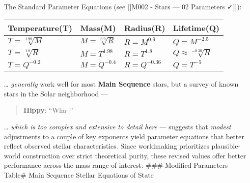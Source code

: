 \documentclass[
  letterpaper,
]{book}
\begin{document}
The Standard Parameter Equations (see {[}{[}M002 - Stars --- 02
Parameters ✓{]}{]}):

\begin{longtable}[]{@{}
  >{\centering\arraybackslash}p{}
  >{\centering\arraybackslash}p{}
  >{\centering\arraybackslash}p{}
  >{\centering\arraybackslash}p{}@{}}
\toprule\noalign{}
\begin{minipage}[b]{\linewidth}\centering
Temperature(T)
\end{minipage} & \begin{minipage}[b]{\linewidth}\centering
Mass(M)
\end{minipage} & \begin{minipage}[b]{\linewidth}\centering
Radius(R)
\end{minipage} & \begin{minipage}[b]{\linewidth}\centering
Lifetime(Q)
\end{minipage} \\
\midrule\noalign{}
\endhead
\bottomrule\noalign{}
\endlastfoot
\(T=\sqrt[1.98]{M}\) & \(M=\sqrt[0.9]{R}\) & \(R=M^{0.9}\) &
\(Q=M^{-2.5}\) \\
\(T=\sqrt[1.8]{R}\) & \(M=T^{1.98}\) & \(R=T^{1.8}\) &
\(Q \approx \sqrt[-0.36]{R}\) \\
\(T=Q^{-0.2}\) & \(M=Q^{-0.4}\) & \(R=Q^{-0.36}\) & \(Q=T^{-5}\) \\
\end{longtable}

\ldots{} \emph{generally} work well for most \textbf{Main Sequence}
stars, but a survey of known stars in the Solar neighborhood ---

\begin{quote}
\textbf{Hippy}: ``Wha--''
\end{quote}

\ldots{} \emph{which is too complex and extensive to detail here} ---
suggests that \emph{modest} adjustments to a couple of key exponents
yield parameter equations that better reflect observed stellar
characteristics. Since worldmaking prioritizes plausible-world
construction over strict theoretical purity, these revised values offer
better performance across the mass range of interest. \#\#\# Modified
Parameters Table\# Main Sequence Stellar Equations of State
\end{document}
